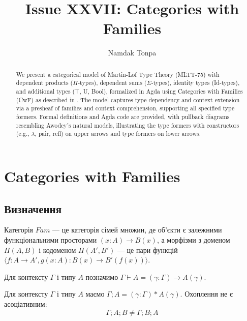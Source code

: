 \documentclass{article}
\begin{document}
\title{Issue XXVII: Categories with Families}
\author{Namdak Tonpa}
\date{}

\maketitle

\begin{abstract}
We present a categorical model of Martin-Löf Type Theory (MLTT-75) with dependent products ($\Pi$-types), dependent sums ($\Sigma$-types), identity types (Id-types), and additional types ($\top$, U, Bool), formalized in Agda using Categories with Families (CwF) as described in \cite{awodey2019}. The model captures type dependency and context extension via a presheaf of families and context comprehension, supporting all specified type formers. Formal definitions and Agda code are provided, with pullback diagrams resembling Awodey’s natural models, illustrating the type formers with constructors (e.g., $\lambda$, pair, refl) on upper arrows and type formers on lower arrows.
\end{abstract}


\section{Categories with Families}

\subsection{Визначення}

\begin{definition}[Fam]
Категорія $Fam$ --- це категорія сімей множин, де об’єкти є залежними функціональними просторами $(x:A)\rightarrow B(x)$, а морфізми з доменом $\Pi(A,B)$ і кодоменом $\Pi(A',B')$ --- це пари функцій $\langle f:A\rightarrow A', g(x:A):B(x)\rightarrow B'(f(x)) \rangle$.
\end{definition}

\begin{definition}[$\Pi$-похідність]
Для контексту $\Gamma$ і типу $A$ позначимо $\Gamma\vdash A = (\gamma:\Gamma)\rightarrow A(\gamma)$.
\end{definition}

\begin{definition}
Для контексту $\Gamma$ і типу $A$ маємо $\Gamma;A = (\gamma:\Gamma)*A(\gamma)$. Охоплення не є асоціативним:
\[
    \Gamma;A;B \neq \Gamma;B;A
\]
\end{definition}
\end{document}
